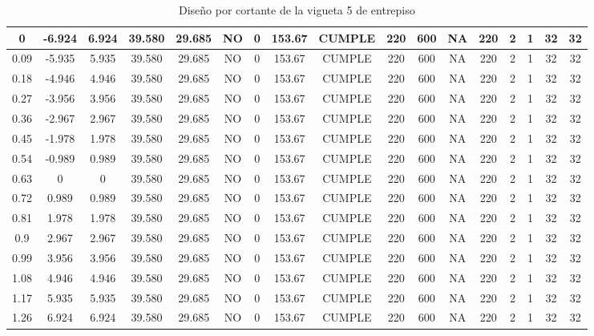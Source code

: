 \begin{table}[H]
{\begin{tabular}{|c|c|c|c|c|c|c|c|c|c|c|c|c|c|c|c|c|}
        \hline
    0   & -6.924 & 6.924 & 39.580 & 29.685 & NO  & 0   & 153.67 & CUMPLE & 220 & 600 & NA  & 220 & 2   & 1   & 32  & 32 \bigstrut\\
    \hline
    0.09 & -5.935 & 5.935 & 39.580 & 29.685 & NO  & 0   & 153.67 & CUMPLE & 220 & 600 & NA  & 220 & 2   & 1   & 32  & 32 \bigstrut\\
    \hline
    0.18 & -4.946 & 4.946 & 39.580 & 29.685 & NO  & 0   & 153.67 & CUMPLE & 220 & 600 & NA  & 220 & 2   & 1   & 32  & 32 \bigstrut\\
    \hline
    0.27 & -3.956 & 3.956 & 39.580 & 29.685 & NO  & 0   & 153.67 & CUMPLE & 220 & 600 & NA  & 220 & 2   & 1   & 32  & 32 \bigstrut\\
    \hline
    0.36 & -2.967 & 2.967 & 39.580 & 29.685 & NO  & 0   & 153.67 & CUMPLE & 220 & 600 & NA  & 220 & 2   & 1   & 32  & 32 \bigstrut\\
    \hline
    0.45 & -1.978 & 1.978 & 39.580 & 29.685 & NO  & 0   & 153.67 & CUMPLE & 220 & 600 & NA  & 220 & 2   & 1   & 32  & 32 \bigstrut\\
    \hline
    0.54 & -0.989 & 0.989 & 39.580 & 29.685 & NO  & 0   & 153.67 & CUMPLE & 220 & 600 & NA  & 220 & 2   & 1   & 32  & 32 \bigstrut\\
    \hline
    0.63 & 0   & 0   & 39.580 & 29.685 & NO  & 0   & 153.67 & CUMPLE & 220 & 600 & NA  & 220 & 2   & 1   & 32  & 32 \bigstrut\\
    \hline
    0.72 & 0.989 & 0.989 & 39.580 & 29.685 & NO  & 0   & 153.67 & CUMPLE & 220 & 600 & NA  & 220 & 2   & 1   & 32  & 32 \bigstrut\\
    \hline
    0.81 & 1.978 & 1.978 & 39.580 & 29.685 & NO  & 0   & 153.67 & CUMPLE & 220 & 600 & NA  & 220 & 2   & 1   & 32  & 32 \bigstrut\\
    \hline
    0.9 & 2.967 & 2.967 & 39.580 & 29.685 & NO  & 0   & 153.67 & CUMPLE & 220 & 600 & NA  & 220 & 2   & 1   & 32  & 32 \bigstrut\\
    \hline
    0.99 & 3.956 & 3.956 & 39.580 & 29.685 & NO  & 0   & 153.67 & CUMPLE & 220 & 600 & NA  & 220 & 2   & 1   & 32  & 32 \bigstrut\\
    \hline
    1.08 & 4.946 & 4.946 & 39.580 & 29.685 & NO  & 0   & 153.67 & CUMPLE & 220 & 600 & NA  & 220 & 2   & 1   & 32  & 32 \bigstrut\\
    \hline
    1.17 & 5.935 & 5.935 & 39.580 & 29.685 & NO  & 0   & 153.67 & CUMPLE & 220 & 600 & NA  & 220 & 2   & 1   & 32  & 32 \bigstrut\\
    \hline
    1.26 & 6.924 & 6.924 & 39.580 & 29.685 & NO  & 0   & 153.67 & CUMPLE & 220 & 600 & NA  & 220 & 2   & 1   & 32  & 32 \bigstrut\\
    \hline
    
    \end{tabular}}%
    \caption{Diseño por cortante de la vigueta 5 de entrepiso}
  \label{tab:CORT VT5 EP}%
\end{table}%
